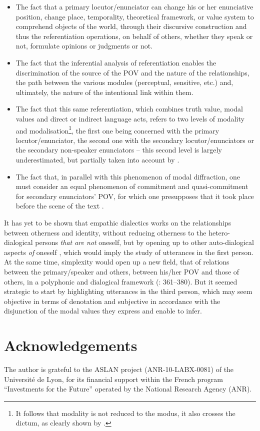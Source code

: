 \documentclass[output=paper]{langscibook}
\begin{document}
\begin{itemize}\sloppy
\item The fact that a primary locutor/enunciator can change his or her enunciative position, change place, temporality, theoretical framework, or value system to comprehend objects of the world, through their discursive construction and thus the referentiation operations, on behalf of others, whether they speak or not, formulate opinions or judgments or not.

\item The fact that the inferential analysis of referentiation enables the discrimination of the source of the POV and the nature of the relationships, the path between the various modules (perceptual, sensitive, etc.) and, ultimately, the nature of the intentional link within them.

\item The fact that this same referentiation, which combines truth value, modal values and direct or indirect language acts, refers to two levels of modality and modalisation\footnote{It follows that modality is not reduced to the modus, it also crosses the dictum, as clearly shown by \citealt{Ducrot1993}.}, the first one being concerned with the primary locutor/enunciator, the second one with the secondary locutor/enunciators or the secondary non-speaker enunciators -- this second level is largely underestimated, but partially taken into account by \citet{Gosselin2010}. 

\item The fact that, in parallel with this phenomenon of modal diffraction, one must consider an equal phenomenon of commitment and quasi-commitment for secondary enunciators’ POV, for which one presupposes that it took place before the scene of the text \citep{Rabatel2009}.
\end{itemize}

It has yet to be shown that empathic dialectics works on the relationships between otherness and identity, without reducing otherness to the het\-ero-dia\-log\-ical persons \textit{that are not} oneself, but by opening up to other auto-dialogical aspects \textit{of} oneself \citep{Rabatel2016}, which would imply the study of utterances in the first person. At the same time, simplexity would open up a new field, that of relations between the primary/speaker and others, between his/her POV and those of others, in a polyphonic and dialogical framework (\citealt{Rabatel2008a}: 361--380). But it seemed strategic to start by highlighting utterances in the third person, which may seem objective in terms of denotation and subjective in accordance with the disjunction of the modal values they express and enable to infer.

\section*{Acknowledgements}
The author is grateful to the ASLAN project (ANR-10-LABX-0081) of the Université de Lyon, for its financial support within the French program “Investments for the Future” operated by the National Research Agency (ANR).

{\sloppy\printbibliography[heading=subbibliography,notkeyword=this]}
\end{document}
